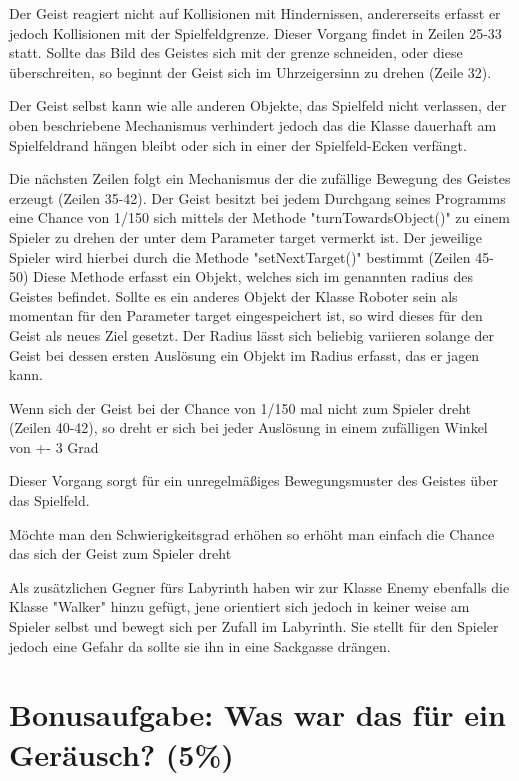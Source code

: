 \documentclass{pi1}
\begin{document}
Der Geist reagiert nicht auf Kollisionen mit Hindernissen, andererseits erfasst er jedoch Kollisionen mit der Spielfeldgrenze. Dieser Vorgang findet in Zeilen 25-33 statt. Sollte das Bild des Geistes sich mit der grenze schneiden, oder diese überschreiten, so beginnt der Geist sich im Uhrzeigersinn zu drehen (Zeile 32).

Der Geist selbst kann wie alle anderen Objekte, das Spielfeld nicht verlassen, der oben beschriebene Mechanismus verhindert jedoch das die Klasse dauerhaft am Spielfeldrand hängen bleibt oder sich in einer der Spielfeld-Ecken verfängt. 

Die nächsten Zeilen folgt ein Mechanismus der die zufällige Bewegung des Geistes erzeugt (Zeilen 35-42).
Der Geist besitzt bei jedem Durchgang seines 
Programms eine Chance von 1/150 sich mittels der Methode "turnTowardsObject()"
zu einem Spieler zu drehen der unter dem Parameter target vermerkt ist.\newline
Der jeweilige Spieler wird hierbei durch die Methode "setNextTarget()" bestimmt (Zeilen 45-50)\newline
Diese Methode erfasst ein Objekt, welches sich im genannten radius des Geistes befindet. Sollte es ein anderes Objekt der Klasse Roboter sein als momentan für den Parameter target eingespeichert ist, so wird dieses für den Geist als neues Ziel gesetzt.\newline
Der Radius lässt sich beliebig variieren solange der Geist bei dessen ersten Auslösung ein Objekt im Radius erfasst, das er jagen kann.

Wenn sich der Geist bei der Chance von 1/150 mal nicht zum Spieler dreht (Zeilen 40-42), so dreht er sich bei jeder Auslösung in einem zufälligen Winkel von +- 3 Grad

Dieser Vorgang sorgt für ein unregelmäßiges Bewegungsmuster des Geistes über das Spielfeld.

Möchte man den Schwierigkeitsgrad erhöhen so erhöht man einfach die Chance das sich der Geist zum Spieler dreht

Als zusätzlichen Gegner fürs Labyrinth haben wir zur Klasse Enemy ebenfalls die Klasse "Walker" hinzu gefügt, jene orientiert sich jedoch in keiner weise am Spieler selbst und bewegt sich per Zufall im Labyrinth.
Sie stellt für den Spieler jedoch eine Gefahr da sollte sie ihn in eine Sackgasse drängen.

\section{Bonusaufgabe: Was war das für ein Geräusch? (5\%)}
\end{document}
